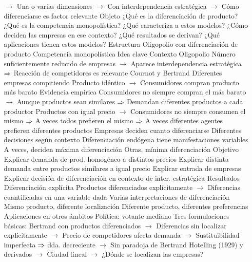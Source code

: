 \documentclass{nuevotema}
\begin{document}
\begin{esquemal}
				\4[] $\to$ Una o varias dimensiones
				\4[] $\to$ Con interdependencia estratégica
				\4[] $\to$ Cómo diferenciarse es factor relevante
		\2 Objeto
			\3 ¿Qué es la diferenciación de producto?
			\3 ¿Qué es la competencia monopolística?
			\3 ¿Qué caracteriza a estos modelos?
			\3 ¿Cómo deciden las empresas en ese contexto?
			\3 ¿Qué resultados se derivan?
			\3 ¿Qué aplicaciones tienen estos modelos?
		\2 Estructura
			\3 Oligopolio con diferenciación de producto
			\3 Competencia monopolística
	\1 
		\2 Idea clave
			\3 Contexto
				\4 Oligopolio
				\4[] Número suficientemente reducido de empresas
				\4[] $\to$ Aparece interdependencia estratégica
				\4[] $\Rightarrow$ Reacción de competidores es relevante
				\4 Cournot y Bertrand
				\4[] Diferentes empresas compitiendo
				\4[] Producto idéntico
				\4[] $\to$ Consumidores compran producto más barato
				\4 Evidencia empírica
				\4[] Consumidores no siempre compran el más barato
				\4[] $\to$ Aunque productos sean similares
				\4[] $\Rightarrow$  Demandan diferentes productos a cada productor
				\4[] Productos con igual precio
				\4[] $\to$ Consumidores no siempre consumen el mismo
				\4[] $\Rightarrow$ A veces todos prefieren el mismo
				\4[] $\Rightarrow$ A veces diferentes agentes prefieren diferentes productos
				\4 Empresas deciden cuanto diferenciarse
				\4[] Diferentes decisiones según contexto
				\4 Diferenciación endógena tiene manifestaciones variables
				\4[] A veces, deciden máxima diferenciación
				\4[] Otras, mínima diferenciación
			\3 Objetivo
				\4 Explicar demanda de prod. homogéneo a distintos precios
				\4 Explicar distinta demanda entre productos similares a igual precio
				\4 Explicar entrada de empresas
				\4 Explicar decisión de diferenciación en contexto de inter. estratégica
			\3 Resultados
				\4 Diferenciación explícita
				\4[] Productos diferenciados explícitamente
				\4[] $\to$ Diferencias cuantificadas en una variable dada
				\4 Varias interpretaciones de diferenciación
				\4[] Mismo producto, diferente localización
				\4[] Diferente producto, diferentes preferencias
				\4 Aplicaciones en otros ámbitos
				\4[] Política: votante mediano
				\4 Tres formulaciones básicas:
				\4[(i)] Bertrand con productos diferenciados
				\4[] $\to$ Diferencias sin localizar explícitamente
				\4[] $\to$ Precio de competidores afecta demanda
				\4[] $\to$ Sustituibilidad imperfecta $\Rightarrow$ dda. decreciente
				\4[] $\to$ Sin paradoja de Bertrand
				\4[(ii)] Hotelling (1929) y derivados
				\4[] $\to$ Ciudad lineal
				\4[] $\to$ ¿Dónde se localizan las empresas?

\end{esquemal}
\end{document}
